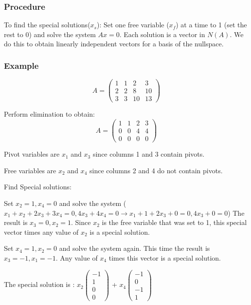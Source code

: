 \documentclass[12pt]{article}
\begin{document}
\begin{itemize}
\subsubsection{Procedure}
To find the special solutions($x_s$): Set one free variable ($x_f$) at a time to 1 (set the rest to 0) and solve the system $Ax = 0$.  Each solution is a vector in $N(A)$. We do this to obtain linearly independent vectors for a basis of the nullspace.

\subsubsection{Example}
\begin{equation*}
A = \begin{pmatrix}
1&1&2&3\\
2&2&8&10\\
3&3&10&13 
\end{pmatrix}
\end{equation*}

Perform elimination to obtain:
\begin{equation*}
A = \begin{pmatrix}
1&1&2&3\\
0&0&4&4\\
0&0&0&0 
\end{pmatrix}
\end{equation*}

Pivot variables are $x_1$ and $x_3$ since columns 1 and 3 contain pivots.

Free variables are $x_2$ and $x_4$ since columns 2 and 4 do not contain pivots.

Find Special solutions:

Set $x_2=1, x_4 = 0$ and solve the system ($x_1+x_2+2x_3+3x_4=0, 4x_3+4x_4=0 \rightarrow x_1+1+2x_3+0 = 0, 4x_3+0 = 0$)
The result is $x_3 = 0, x_2 = 1$.
Since $x_2$ is the free variable that was set to 1, this special vector times any value of $x_2$ is a special solution.

Set $x_4 = 1, x_2 = 0$ and solve the system again.  This time the result is $x_3 = -1, x_1 = -1$. Any value of $x_4$ times this vector is a special solution.

The special solution is : $x_2 \begin{pmatrix}-1\\1\\0\\0\end{pmatrix}$ + $x_4 \begin{pmatrix}-1\\0\\-1\\1\end{pmatrix}$


\end{itemize}
\end{document}
